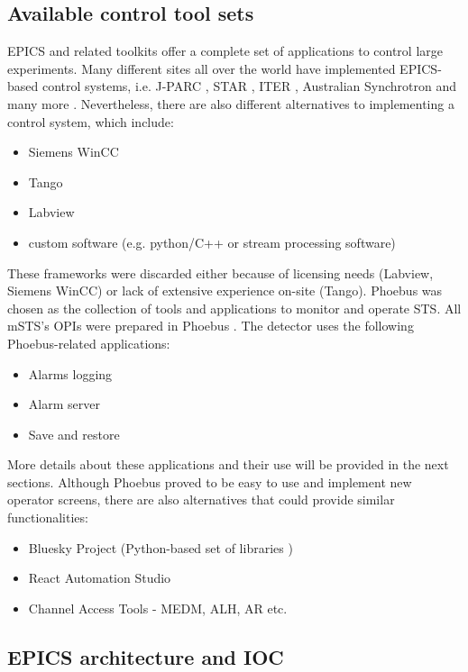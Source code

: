  \subsection{Available control tool sets}
 EPICS and related toolkits offer a complete set of applications to control large experiments. Many different sites all over the world have implemented EPICS-based control systems, i.e. \gls{J-PARC} \cite{J-PARC}, \gls{STAR} \cite{STAR}, \gls{ITER} \cite{ITER}, Australian Synchrotron and many more \cite{EPICS_site}.  Nevertheless, there are also different alternatives to implementing a control system, which include: 
 \begin{itemize}
     \item Siemens WinCC \cite{Camacho:2022fxa,Goralczyk:2022udx}
     \item Tango \cite{Santander-Vela:2021tma}
     \item Labview \cite{State:2022qlw} 
     \item custom software (e.g. python/C++ or stream processing software) \cite{taurus}
 \end{itemize} 
 These frameworks were discarded either because of licensing needs (Labview, Siemens WinCC) or lack of extensive experience on-site (Tango). Phoebus \cite{Phoebus} was chosen as the collection of tools and applications to monitor and operate \gls{STS}. All \gls{mSTS}'s \glspl{OPI} were prepared in Phoebus \cite{Phoebus}. The detector uses the following Phoebus-related applications:
\begin{itemize}
    \item Alarms logging
    \item Alarm server
    \item Save and restore
\end{itemize}
More details about these applications and their use will be provided in the next sections. Although Phoebus proved to be easy to use and implement new operator screens, there are also alternatives that could provide similar functionalities:
\begin{itemize}
    \item Bluesky Project (Python-based set of libraries \cite{Bluesky})
    \item React Automation Studio \cite{React}
    \item Channel Access Tools - MEDM, \gls{ALH}, \gls{AR} etc. 
\end{itemize}

\subsection{EPICS architecture and IOC}

